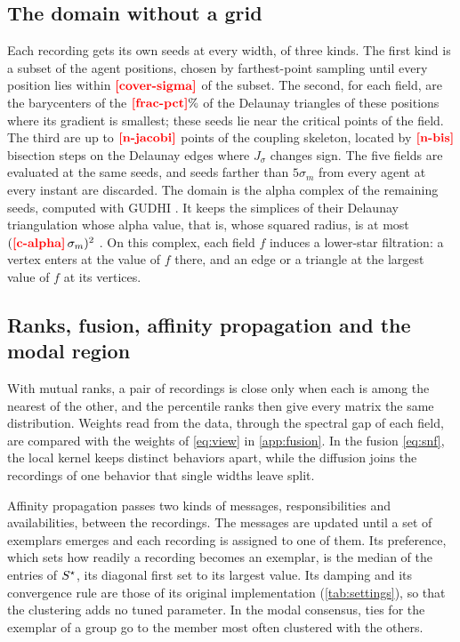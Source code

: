 \subsection{The domain without a grid}

Each recording gets its own seeds at every width, of three kinds. The first kind is a subset of the agent positions,
chosen by farthest-point sampling until every position lies within $\nm{cover-sigma}$ of the subset. The second, for
each field, are the barycenters of the $\nm{frac-pct}\%$ of the Delaunay triangles of these positions where its
gradient is smallest; these seeds lie near the critical points of the field. The third are up to $\nm{n-jacobi}$ points
of the coupling skeleton, located by $\nm{n-bis}$ bisection steps on the Delaunay edges where $J_\sigma$ changes sign.
The five fields are evaluated at the same seeds, and seeds farther than $5\sigma_m$ from every agent at every instant
are discarded. The domain is the alpha complex of the remaining seeds, computed with GUDHI \citep{maria2014gudhi}. It
keeps the simplices of their Delaunay triangulation whose alpha value, that is, whose squared radius, is at most
$(\nm{c-alpha}\,\sigma_m)^2$ \citep{edelsbrunner2010computational}. On this complex, each field $f$ induces a lower-star
filtration: a vertex enters at the value of $f$ there, and an edge or a triangle at the largest value of $f$ at its
vertices.

\subsection{Ranks, fusion, affinity propagation and the modal region}

With mutual ranks, a pair of recordings is close only when each is among the nearest of the other, and the percentile
ranks then give every matrix the same distribution. Weights read from the data, through the spectral gap of each field,
are compared with the weights of \eqref{eq:view} in \cref{app:fusion}. In the fusion \eqref{eq:snf}, the local kernel
keeps distinct behaviors apart, while the diffusion joins the recordings of one behavior that single widths leave split.

Affinity propagation passes two kinds of messages, responsibilities and availabilities, between the recordings. The
messages are updated until a set of exemplars emerges and each recording is assigned to one of them. Its preference,
which sets how readily a recording becomes an exemplar, is the median of the entries of $S^{\star}$, its diagonal first set
to its largest value. Its damping and its convergence rule are those of its original implementation
(\cref{tab:settings}), so that the clustering adds no tuned parameter. In the modal consensus, ties for the
exemplar of a group go to the member most often clustered with the others.

